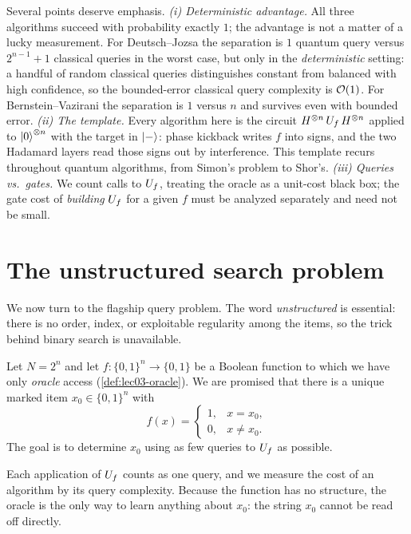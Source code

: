 \begin{remark}
\label{rem:lec03-significance}
Several points deserve emphasis. \emph{(i) Deterministic advantage.} All three
algorithms succeed with probability exactly $1$; the advantage is not a matter of
a lucky measurement. For Deutsch--Jozsa the separation is $1$ quantum query versus
$2^{n-1}+1$ classical queries in the worst case, but only in the
\emph{deterministic} setting: a handful of random classical queries distinguishes
constant from balanced with high confidence, so the bounded-error classical query
complexity is $\mathcal{O}(1)$. For Bernstein--Vazirani the separation is $1$ versus $n$
and survives even with bounded error. \emph{(ii) The template.} Every algorithm
here is the circuit $H^{\otimes n}\,U_{f}\,H^{\otimes n}$ applied to
$\ket{0}^{\otimes n}$ with the target in $\ket{-}$: phase kickback writes $f$ into
signs, and the two Hadamard layers read those signs out by interference. This
template recurs throughout quantum algorithms, from Simon's problem to Shor's.
\emph{(iii) Queries vs.\ gates.} We count calls to $U_{f}$, treating the oracle as a
unit-cost black box; the gate cost of \emph{building} $U_{f}$ for a given $f$ must be
analyzed separately and need not be small.
\end{remark}

\section{The unstructured search problem}
\label{sec:lec03-2}

We now turn to the flagship query problem. The word \emph{unstructured} is
essential: there is no order, index, or exploitable regularity among the items, so
the trick behind binary search is unavailable.

\begin{definition}
\label{def:lec03-search}
Let $N=2^{n}$ and let $f\colon\{0,1\}^{n}\to\{0,1\}$ be a Boolean function to which
we have only \emph{oracle} access (\cref{def:lec03-oracle}). We are promised that
there is a unique marked item $x_0\in\{0,1\}^{n}$ with
\[
  f(x)=\begin{cases}1,& x=x_0,\\ 0,& x\neq x_0.\end{cases}
\]
The goal is to determine $x_0$ using as few queries to $U_{f}$ as possible.
\end{definition}

Each application of $U_{f}$ counts as one query, and we measure the cost of an
algorithm by its query complexity. Because the function has no structure, the
oracle is the only way to learn anything about $x_0$: the string $x_0$ cannot be
read off directly.

